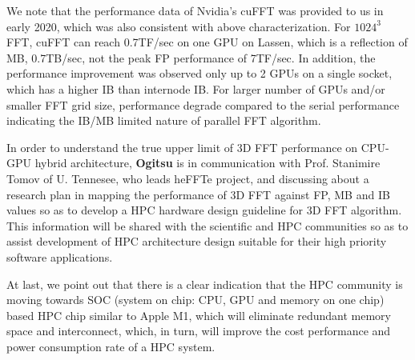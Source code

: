 We note that the performance data of Nvidia's cuFFT was provided to us in early 2020, which was also consistent with above characterization. For $1024^3$ FFT, cuFFT can reach 0.7TF/sec on one GPU on Lassen, which is a reflection of MB, 0.7TB/sec, not the peak FP performance of 7TF/sec. In addition, the performance improvement was observed only up to 2 GPUs on a single socket, which has a higher IB than internode IB. For larger number of GPUs and/or smaller FFT grid size, performance degrade compared to the serial performance indicating the IB/MB limited nature of parallel FFT algorithm.  

In order to understand the true upper limit of 3D FFT performance on CPU-GPU hybrid architecture, {\bf Ogitsu} is in communication with Prof. Stanimire Tomov of U. Tennesee, who leads heFFTe project, and discussing about a research plan in mapping the performance of 3D FFT against FP, MB and IB values so as to develop a HPC hardware design guideline for 3D FFT algorithm. This information will be shared with the scientific and HPC communities so as to assist development of HPC architecture design suitable for their high priority software applications.

At last, we point out that there is a clear indication that the HPC community is moving towards SOC (system on chip: CPU, GPU and memory on one chip) based HPC chip similar to Apple M1, which will eliminate redundant memory space and interconnect, which, in turn, will improve the cost performance and power consumption rate of a HPC system.

